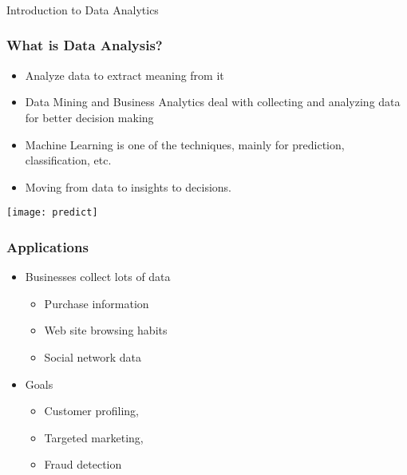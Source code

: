 \begin{frame}[fragile]\frametitle{}
\begin{center}
{\Large Introduction to Data Analytics}
\end{center}
\end{frame}



\begin{frame}[fragile]\frametitle{What is Data Analysis?}
\begin{itemize}
\item Analyze data to extract meaning from it
\item Data Mining and Business Analytics deal with collecting and analyzing data for better decision making
\item Machine Learning is one of the techniques, mainly for prediction, classification, etc.
\item Moving from data to insights to decisions.
\end{itemize}

\begin{center}
\texttt{[image: predict]}
\end{center}
\end{frame}

\begin{frame}[fragile]\frametitle{Applications}
\begin{itemize}
\item Businesses collect lots of data
	\begin{itemize}
	\item Purchase information 
	\item Web site browsing habits
	\item Social network data
	\end{itemize}

\item Goals
	\begin{itemize}
	\item Customer profiling,
	\item Targeted marketing,
	\item Fraud detection
	\end{itemize}
\end{itemize}
\end{frame}


